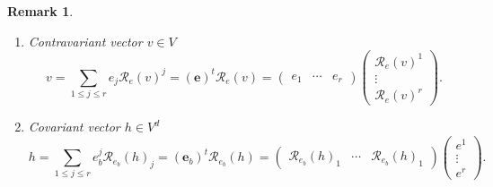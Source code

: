 \documentclass[aps,preprint]{revtex4}
\newtheorem{remark}[theorem]{Remark}
\begin{document}
\begin{remark}
\begin{enumerate}
\item Contravariant vector $v\in V$%
\begin{equation}
v=\sum_{1\leq j\leq r}e_{j}\mathcal{R}_{e}\left( v\right) ^{j}=\left( 
\boldsymbol{e}\right) ^{t}\mathcal{R}_{e}\left( v\right) =\left( 
\begin{array}{ccc}
e_{1} & \cdots & e_{r}%
\end{array}%
\right) \left( 
\begin{array}{c}
\mathcal{R}_{e}\left( v\right) ^{1} \\ 
\vdots \\ 
\mathcal{R}_{e}\left( v\right) ^{r}%
\end{array}%
\right) .
\end{equation}

\item Covariant vector $h\in V^{d}$ 
\begin{equation}
h=\sum_{1\leq j\leq r}e_{b}^{j}\mathcal{R}_{e_{b}}\left( h\right)
_{j}=\left( \boldsymbol{e}_{b}\right) ^{t}\mathcal{R}_{e_{b}}\left( h\right)
=\left( 
\begin{array}{ccc}
\mathcal{R}_{e_{b}}\left( h\right) _{1} & \cdots & \mathcal{R}_{e_{b}}\left(
h\right) _{1}%
\end{array}%
\right) \left( 
\begin{array}{c}
e^{1} \\ 
\vdots \\ 
e^{r}%
\end{array}%
\right) .
\end{equation}
\end{enumerate}
\end{remark}
\end{document}
